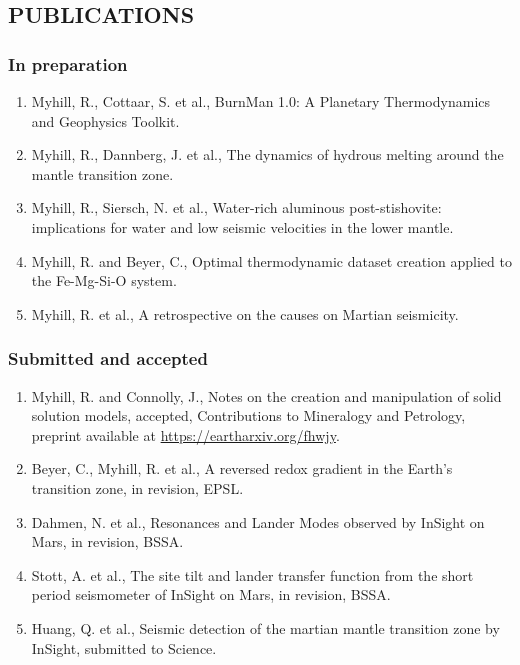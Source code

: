 \documentclass[11pt,twoside,a4paper]{article}
\begin{document}
\clearpage
\subsection*{PUBLICATIONS}
\subsubsection*{In preparation}
\small \sloppy
\begin{enumerate}
\item Myhill, R., Cottaar, S. et al., BurnMan 1.0: A Planetary Thermodynamics and Geophysics Toolkit.
\item Myhill, R., Dannberg, J. et al., The dynamics of hydrous melting around the mantle transition zone.
\item Myhill, R., Siersch, N. et al., Water-rich aluminous post-stishovite: implications for water and low seismic velocities in the lower mantle.
\item Myhill, R. and Beyer, C., Optimal thermodynamic dataset creation applied to the Fe-Mg-Si-O system.
\item Myhill, R. et al., A retrospective on the causes on Martian seismicity.
\end{enumerate}

\subsubsection*{Submitted and accepted}
\begin{enumerate}
  \item Myhill, R. and Connolly, J., Notes on the creation and manipulation of solid solution models, accepted, Contributions to Mineralogy and Petrology, preprint available at \href{https://eartharxiv.org/fhwjy}{https://eartharxiv.org/fhwjy}.
  \item Beyer, C., Myhill, R. et al., A reversed redox gradient in the Earth's transition zone, in revision, EPSL.
  \item Dahmen, N. et al., Resonances and Lander Modes observed by InSight on Mars, in revision, BSSA.
  \item Stott, A. et al., The site tilt and lander transfer function from the short period seismometer of InSight on Mars, in revision, BSSA.
  \item Huang, Q. et al., Seismic detection of the martian mantle transition zone by InSight, submitted to Science.
\end{enumerate}
\end{document}
